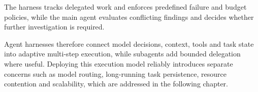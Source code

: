 The harness tracks delegated work and enforces predefined failure and budget policies, while the main agent evaluates conflicting findings and decides whether further investigation is required.

Agent harnesses therefore connect model decisions, context, tools and task state into adaptive multi-step execution, while subagents add bounded delegation where useful. Deploying this execution model reliably introduces separate concerns such as model routing, long-running task persistence, resource contention and scalability, which are addressed in the following chapter.

